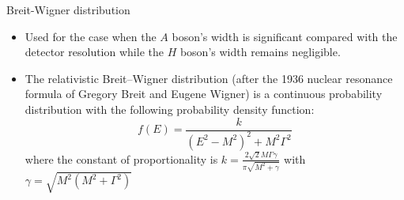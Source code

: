\documentclass[10pt]{beamer} %
\begin{document}
\begin{frame}{Breit-Wigner distribution}
    \begin{itemize}
        \item     Used for the case when the $A$ boson's width is significant compared with the detector resolution while the $H$ boson's width remains negligible.
        \item     The relativistic Breit–Wigner distribution (after the 1936 nuclear resonance formula of Gregory Breit and Eugene Wigner) is a continuous probability distribution with the following probability density function:
        \begin{equation}
        f(E) = \frac{k}{\left(E^2-M^2\right)^2+M^2\Gamma^2}
        \end{equation}
        where the constant of proportionality is $k = \frac{2 \sqrt{2} M \Gamma  \gamma }{\pi \sqrt{M^2+\gamma}}$ with $\gamma=\sqrt{M^2\left(M^2+\Gamma^2\right)}$ 

    \end{itemize}
\end{frame}
\end{document}
